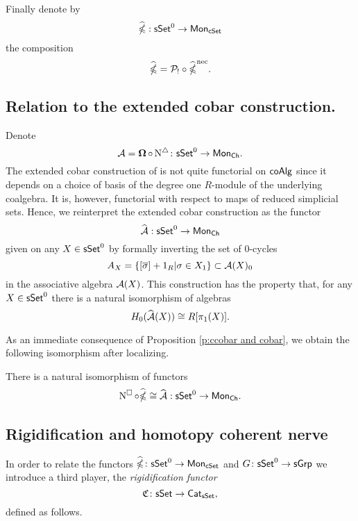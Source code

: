 Finally denote by $$\widehat{\operatorname{\mathbb{\Omega}}}: \mathsf{sSet}^0 \to \mathsf{Mon}_{\mathsf{cSet}}$$ the composition $$\widehat{\operatorname{\mathbb{\Omega}}}= \mathcal{P}_{!} \circ \widehat{\operatorname{\mathbb{\Omega}}}^{\text{nec}}.$$ 

\subsection{Relation to the extended cobar construction.}

Denote $$\operatorname{\mathcal{A}}= \operatorname{\mathbf{\Omega}} \circ \operatorname{N^{\triangle}} \colon \mathsf{sSet}^0 \to \mathsf{Mon}_{\mathsf{Ch}}.$$ The extended cobar construction of \cite{hess2010cobar} is not quite functorial on $\mathsf{coAlg}$ since it depends on a choice of basis of the degree one $R$-module of the underlying coalgebra. It is, however, functorial with respect to maps of reduced simplicial sets. Hence, we reinterpret the extended cobar construction as the functor $$\widehat{\operatorname{\mathcal{A}}}: \mathsf{sSet}^0 \to \mathsf{Mon}_{\mathsf{Ch}}$$
given on any $X \in \mathsf{sSet}^0$ by formally inverting the set of $0$-cycles $$A_X=\{ [\overline{\sigma}]+1_R | \sigma \in X_1 \} \subset \operatorname{\mathcal{A}}(X)_0$$ in the associative algebra $\operatorname{\mathcal{A}}(X)$. This construction has the property that, for any $X \in \mathsf{sSet}^0$ there is a natural isomorphism of algebras $$H_0(\widehat{\operatorname{\mathcal{A}}}(X)) \cong R[\pi_1(X)].$$

As an immediate consequence of Proposition \ref{p:ccobar and cobar}, we obtain the following isomorphism after localizing.

\begin{corollary}\label{localizedcobar}
There is a natural isomorphism of functors
$$\operatorname{N^{\square}} \circ \widehat{\operatorname{\mathbb{\Omega}}} \cong \widehat{\operatorname{\mathcal{A}}} :\mathsf{sSet}^0 \to \mathsf{Mon}_{\mathsf{Ch}}.$$ 
\end{corollary}





\subsection{Rigidification and homotopy coherent nerve}
In order to relate the functors $\widehat{\operatorname{\mathbb{\Omega}}} \colon \mathsf{sSet}^0 \to \mathsf{Mon}_{\mathsf{cSet}}$ and $G \colon \mathsf{sSet}^0\to \mathsf{sGrp}$ we introduce a third player, the \textit{rigidification functor} $$\mathfrak{C} \colon \mathsf{sSet} \to \mathsf{Cat}_{\mathsf{sSet}}, $$ defined as follows.

